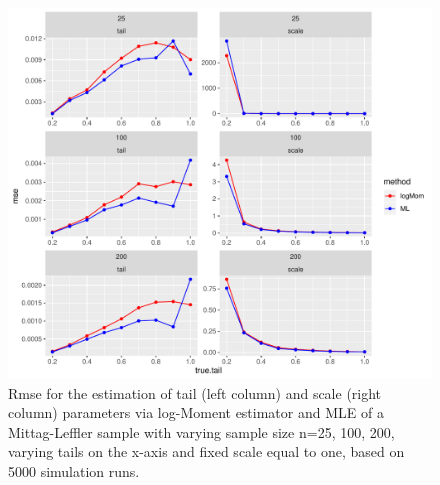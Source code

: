 \documentclass[]{elsarticle} %
\begin{document}
\begin{figure}

{\centering \includegraphics[width=0.9\linewidth]{article_springer_files/figure-latex/MSE-1} 

}

\caption{\label{fig:MSE} Rmse for the estimation of tail (left column) and scale (right column) parameters via log-Moment estimator and MLE of a Mittag-Leffler sample with varying sample size n=25, 100, 200, varying tails on the x-axis and fixed scale equal to one, based on 5000 simulation runs.}\label{fig:MSE}
\end{figure}
\end{document}
